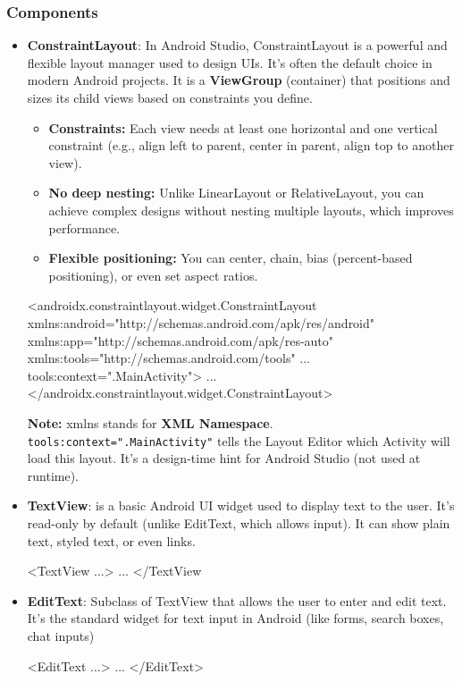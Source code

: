 \documentclass{report}
\begin{document}
    \pagebreak 
    \subsubsection{Components}
    \begin{itemize}
        \item \textbf{ConstraintLayout}: In Android Studio, ConstraintLayout is a powerful and flexible layout manager used to design UIs. It's often the default choice in modern Android projects. 
            \bigbreak \noindent 
            It is a \textbf{ViewGroup} (container) that positions and sizes its child views based on constraints you define.
            \begin{itemize}
                \item \textbf{Constraints:} Each view needs at least one horizontal and one vertical constraint (e.g., align left to parent, center in parent, align top to another view).
                \item \textbf{No deep nesting:} Unlike LinearLayout or RelativeLayout, you can achieve complex designs without nesting multiple layouts, which improves performance.
                \item \textbf{Flexible positioning:} You can center, chain, bias (percent-based positioning), or even set aspect ratios.
            \end{itemize}
            \bigbreak \noindent 
            \begin{xmlcode}
            <androidx.constraintlayout.widget.ConstraintLayout 
            xmlns:android="http://schemas.android.com/apk/res/android" 
            xmlns:app="http://schemas.android.com/apk/res-auto"
            xmlns:tools="http://schemas.android.com/tools"
            ...
            tools:context=".MainActivity">
                ...
            </androidx.constraintlayout.widget.ConstraintLayout>
            \end{xmlcode}
            \bigbreak \noindent 
            \textbf{Note:} xmlns stands for \textbf{XML Namespace}. 
            \bigbreak \noindent 
            \texttt{tools:context=".MainActivity"} tells the Layout Editor which Activity will load this layout. It's a design-time hint for Android Studio (not used at runtime).
        \item \textbf{TextView}: is a basic Android UI widget used to display text to the user. It's read-only by default (unlike EditText, which allows input). It can show plain text, styled text, or even links.
            \bigbreak \noindent 
            \begin{xmlcode}
                <TextView ...>
                    ...
                </TextView
            \end{xmlcode}
        \item \textbf{EditText}: Subclass of TextView that allows the user to enter and edit text. It's the standard widget for text input in Android (like forms, search boxes, chat inputs)
            \bigbreak \noindent 
            \begin{xmlcode}
                <EditText ...>
                    ...
                </EditText>
            \end{xmlcode}


\end{itemize}
\end{document}
